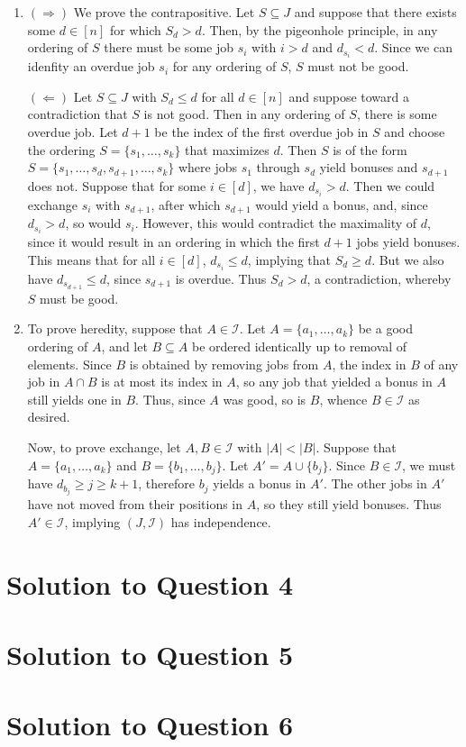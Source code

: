 \documentclass[11pt]{article}
\newcommand{\I}{\mathcal{I}}
\begin{document}
\begin{enumerate}[\indent (1)]
  \item $(\Rightarrow)$ We prove the contrapositive.
      Let $S \subseteq J$ and suppose that there exists some $d \in [n]$ for which $S_d > d$.
      Then, by the pigeonhole principle, in any ordering of $S$ there must be some job $s_i$ with $i > d$ and $d_{s_i} < d$.
      Since we can idenfity an overdue job $s_i$ for any ordering of $S$, $S$ must not be good.

      $(\Leftarrow)$ Let $S \subseteq J$ with $S_d \leq d$ for all $d \in [n]$ and suppose toward a contradiction that $S$ is not good.
      Then in any ordering of $S$, there is some overdue job.
      Let $d + 1$ be the index of the first overdue job in $S$ and choose the ordering $S = \{s_1, \dots, s_k\}$ that maximizes $d$.
      Then $S$ is of the form $S = \{s_1, \dots, s_d, s_{d+1}, \dots, s_k\}$ where jobs $s_1$ through $s_{d}$ yield bonuses and $s_{d+1}$ does not.
      Suppose that for some $i \in [d]$, we have $d_{s_i} > d$.
      Then we could exchange $s_i$ with $s_{d+1}$, after which $s_{d+1}$ would yield a bonus, and, since $d_{s_i} > d$, so would $s_i$.
      However, this would contradict the maximality of $d$, since it would result in an ordering in which the first $d+1$ jobs yield bonuses.
      This means that for all $i \in [d]$, $d_{s_i} \leq d$, implying that $S_d \geq d$.
      But we also have $d_{s_{d+1}} \leq d$, since $s_{d+1}$ is overdue.
      Thus $S_d > d$, a contradiction, whereby $S$ must be good.

    \item To prove heredity, suppose that $A \in \I$.
      Let $A = \{a_1, \dots, a_k\}$ be a good ordering of $A$, and let $B \subseteq A$ be ordered identically up to removal of elements.
      Since $B$ is obtained by removing jobs from $A$, the index in $B$ of any job in $A \cap B$ is at most its index in $A$, so any job that yielded a bonus in $A$ still yields one in $B$.
      Thus, since $A$ was good, so is $B$, whence $B \in \I$ as desired.

      Now, to prove exchange, let $A, B \in \I$ with $|A| < |B|$.
      Suppose that $A = \{a_1, \dots, a_k\}$ and $B = \{b_1, \dots, b_j\}$.
      Let $A' = A \cup \{b_j\}$.
      Since $B \in \I$, we must have $d_{b_j} \geq j \geq k + 1$, therefore $b_j$ yields a bonus in $A'$.
      The other jobs in $A'$ have not moved from their positions in $A$, so they still yield bonuses.
      Thus $A' \in \I$, implying $(J, \I)$ has independence.

\end{enumerate}

\section{Solution to Question 4}



\section{Solution to Question 5}



\section{Solution to Question 6}
\end{document}
